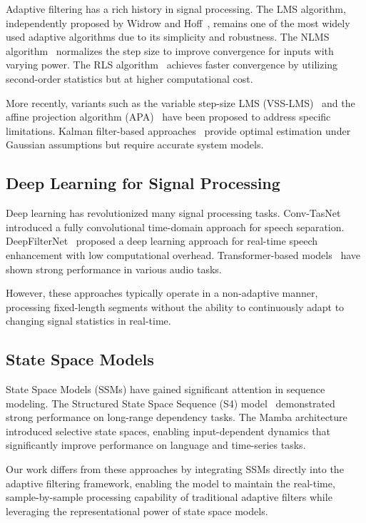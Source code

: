 \documentclass[a4paper,fleqn]{cas-sc}
\begin{document}
Adaptive filtering has a rich history in signal processing. The LMS algorithm, independently proposed by Widrow and Hoff~\citep{widrow1960adaptive}, remains one of the most widely used adaptive algorithms due to its simplicity and robustness. The NLMS algorithm~\citep{nagumo1967weight} normalizes the step size to improve convergence for inputs with varying power. The RLS algorithm~\citep{sayed2003fundamentals} achieves faster convergence by utilizing second-order statistics but at higher computational cost.

More recently, variants such as the variable step-size LMS (VSS-LMS)~\citep{kwong1992variable} and the affine projection algorithm (APA)~\citep{ozeki1984adaptive} have been proposed to address specific limitations. Kalman filter-based approaches~\citep{haykin2002adaptive} provide optimal estimation under Gaussian assumptions but require accurate system models.

\subsection{Deep Learning for Signal Processing}

Deep learning has revolutionized many signal processing tasks. Conv-TasNet~\citep{luo2019conv} introduced a fully convolutional time-domain approach for speech separation. DeepFilterNet~\citep{schroeter2022deepfilternet} proposed a deep learning approach for real-time speech enhancement with low computational overhead. Transformer-based models~\citep{luo2020dual} have shown strong performance in various audio tasks.

However, these approaches typically operate in a non-adaptive manner, processing fixed-length segments without the ability to continuously adapt to changing signal statistics in real-time.

\subsection{State Space Models}

State Space Models (SSMs) have gained significant attention in sequence modeling. The Structured State Space Sequence (S4) model~\citep{gu2022efficiently} demonstrated strong performance on long-range dependency tasks. The Mamba architecture~\citep{gu2023mamba} introduced selective state spaces, enabling input-dependent dynamics that significantly improve performance on language and time-series tasks.

Our work differs from these approaches by integrating SSMs directly into the adaptive filtering framework, enabling the model to maintain the real-time, sample-by-sample processing capability of traditional adaptive filters while leveraging the representational power of state space models.
\end{document}
